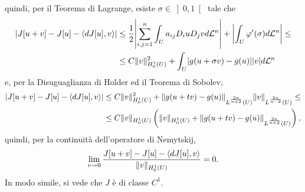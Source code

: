 quindi, per il Teorema di Lagrange, esiste $\sigma \in \left] 0,1\right[ $ tale che
\begin{align*}
\abs{J[u+v]-J[u]-\braket{dJ[u],v}} &\le \frac{1}{2} \abs*{\sum_{i,j=1}^{n}\int_U a_{ij}D_iuD_jvd\mathcal{L}^n} + \abs*{\int_U \varphi'(\sigma)d\mathcal{L}^n} \le \\
&\le C\norm{v}_{H^1_0(U)}^2 + \int_U \abs{g(u+\sigma v)-g(u)}\abs{v}d\mathcal{L}^n
\end{align*}
e, per la Disuguaglianza di Holder ed il Teorema di Sobolev,
\begin{align*}
	\lvert J[u+v]-J[u]-\braket{dJ[u],v}\rvert &\le C\lVert v\rVert_{H^1_0(U)}^2 +\lVert g(u+tv)-g(u)\rVert_{L^{\frac{2n}{n+2}}(U)} \lVert v\rVert_{L^{\frac{2n}{n-2}}(U)}\le  \\
	&\le C\lVert v\rVert_{H^1_0(U)} \left( \lVert v\rVert_{H^1_0(U)} + \lVert g(u+tv)-g(u)\rVert_{L^{\frac{2n}{n+2}}(U)}\right),
\end{align*}
quindi, per la continuità dell'operatore di Nemytskij,
\[ \lim\limits_{v \to 0} \frac{J[u+v]-J[u]-\braket{dJ[u],v}}{\lVert v\rVert_{H^1_0(U)}}  =0. \]
In modo simile, si vede che $J$ è di classe $C^1$.

